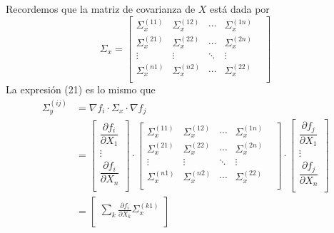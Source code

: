 \documentclass[a4paper, 10pt]{article}
\begin{document}
Recordemos que la matriz de covarianza de $X$ está dada por
\begin{equation}
    \Sigma_x = \begin{bmatrix}
        \Sigma_x^{(11)} & \Sigma_x^{(12)} & \cdots & \Sigma_x^{(1n)}   \\
        \Sigma_x^{(21)} & \Sigma_x^{(22)} & \cdots & \Sigma_x^{(2n)}   \\
        \vdots          & \vdots          & \ddots & \vdots            \\
        \Sigma_x^{(n1)} & \Sigma_x^{(n2)} & \cdots & \Sigma_x^{(22)} & \\
    \end{bmatrix}
\end{equation}
La expresión (21) es lo mismo que
\begin{equation}
    \begin{split}
        \Sigma_y^{(ij)} &= \nabla f_i \cdot \Sigma_x \cdot \nabla f_j \\[1em]
        &=\begin{bmatrix}
            \dfrac{\partial f_i}{\partial X_1} \\
            \vdots                             \\
            \dfrac{\partial f_i}{\partial X_n} \\
        \end{bmatrix}
        \cdot
        \begin{bmatrix}
            \Sigma_x^{(11)} & \Sigma_x^{(12)} & \cdots & \Sigma_x^{(1n)}   \\
            \Sigma_x^{(21)} & \Sigma_x^{(22)} & \cdots & \Sigma_x^{(2n)}   \\
            \vdots          & \vdots          & \ddots & \vdots            \\
            \Sigma_x^{(n1)} & \Sigma_x^{(n2)} & \cdots & \Sigma_x^{(22)} & \\
        \end{bmatrix}
        \cdot
        \begin{bmatrix}
            \dfrac{\partial f_j}{\partial X_1} \\
            \vdots                             \\
            \dfrac{\partial f_j}{\partial X_n} \\
        \end{bmatrix}
        \\[1em]
        &=\begin{bmatrix}
            \sum_{k} {\frac{\partial f_i}{\partial X_k}\Sigma_x^{(k1)}}\\

\end{bmatrix}
\end{split}
\end{equation}
\end{document}
